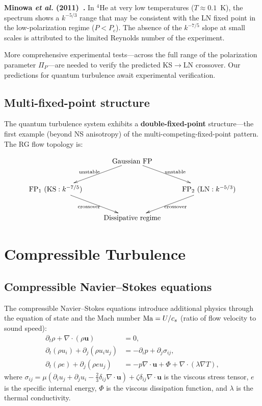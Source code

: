 \textbf{Minowa \textit{et al.} (2011)~\cite{minowa2011transition}.} In $^4$He at very low temperatures ($T\approx 0.1$~K), the spectrum shows a $k^{-5/3}$ range that may be consistent with the LN fixed point in the low-polarization regime ($P < P_c$). The absence of the $k^{-7/5}$ slope at small scales is attributed to the limited Reynolds number of the experiment.

More comprehensive experimental tests---across the full range of the polarization parameter $\Pi_P$---are needed to verify the predicted KS$\to$LN crossover. Our predictions for quantum turbulence await experimental verification.

\subsection{Multi-fixed-point structure}

The quantum turbulence system exhibits a \textbf{double-fixed-point} structure---the first example (beyond NS anisotropy) of the multi-competing-fixed-point pattern. The RG flow topology is:

{\small
\begin{equation}
 \xymatrix{
& \text{Gaussian FP} \ar[dl]_{\text{unstable}} \ar[dr]^{\text{unstable}} & \\
\text{FP}_1~(\KS: k^{-7/5}) \ar[dr]_{\text{crossover}} & & \text{FP}_2~(\LN: k^{-5/3}) \ar[dl]^{\text{crossover}} \\
& \text{Dissipative regime} &
}
\end{equation}
}

\section{Compressible Turbulence\label{sec:compressible}}

\subsection{Compressible Navier--Stokes equations}

The compressible Navier--Stokes equations introduce additional physics through the equation of state and the Mach number $\mathrm{Ma} = U/c_s$ (ratio of flow velocity to sound speed):
{\footnotesize
\begin{align}
 \partial_t\rho + \nabla\cdot(\rho\mathbf{u}) &= 0, \\
\partial_t(\rho u_i) + \partial_j(\rho u_i u_j) &= -\partial_i p + \partial_j\sigma_{ij}, \\
\partial_t(\rho e) + \partial_j(\rho e u_j) &= -p\nabla\cdot\mathbf{u} + \Phi + \nabla\cdot(\lambda\nabla T),
\end{align}
}
where $\sigma_{ij} = \mu(\partial_i u_j + \partial_j u_i - \frac{2}{3}\delta_{ij}\nabla\cdot\mathbf{u}) + \zeta\delta_{ij}\nabla\cdot\mathbf{u}$ is the viscous stress tensor, $e$ is the specific internal energy, $\Phi$ is the viscous dissipation function, and $\lambda$ is the thermal conductivity.

